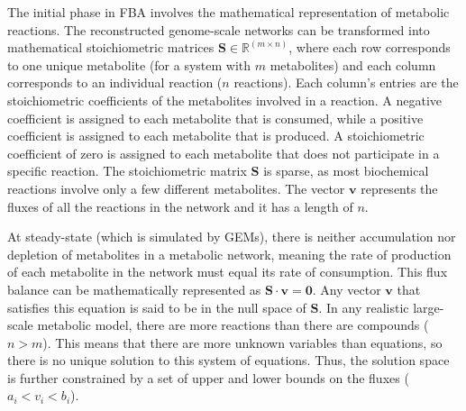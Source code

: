 The initial phase in FBA involves the mathematical representation of metabolic reactions. The reconstructed genome-scale networks can be transformed into mathematical stoichiometric matrices $\mathbf{S}\in\mathbb{R}^{(m\times n)}$, where each row corresponds to one unique metabolite (for a system with $m$ metabolites) and each column corresponds to an individual reaction ($n$ reactions). \cite{Kerkhoven2014} 
Each column's entries are the stoichiometric coefficients of the metabolites involved in a reaction. A negative coefficient is assigned to each metabolite that is consumed, while a positive coefficient is assigned to each metabolite that is produced. A stoichiometric coefficient of zero is assigned to each metabolite that does not participate in a specific reaction. The stoichiometric matrix $\mathbf{S}$ is sparse, as most biochemical reactions involve only a few different metabolites.
The vector $\mathbf{v}$ represents the fluxes of all the reactions in the network and it has a length of $n$. \cite{Orth2010}




At steady-state (which is simulated by GEMs), there is neither accumulation nor depletion of metabolites in a metabolic network, meaning the rate of production of each metabolite in the network must equal its rate of consumption. This flux balance can be mathematically represented as $\mathbf{S}\cdot \mathbf{v} = \mathbf{0}$. \cite{Price2004}
Any vector $\mathbf{v}$ that satisfies this equation is said to be in the null space of $\mathbf{S}$. In any realistic large-scale metabolic model, there are more reactions than there are compounds ($n > m$). This means that there are more unknown variables than equations, so there is no unique solution to this system of equations. \cite{Orth2010} Thus, the solution space is further constrained by a set of upper and lower bounds on the fluxes ($a_i < v_i < b_i$). 

